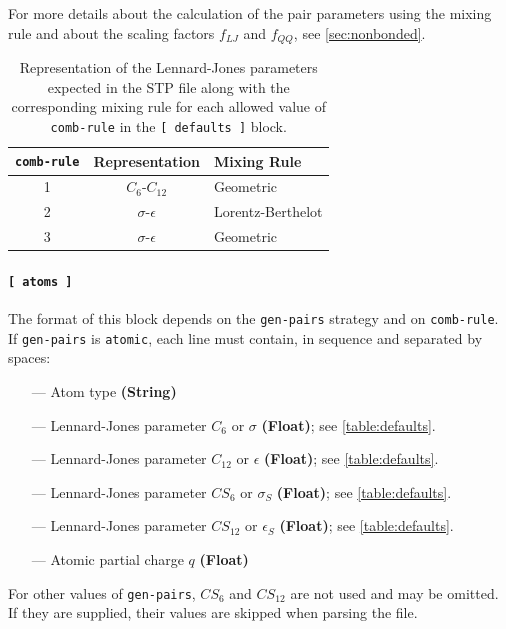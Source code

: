 \documentclass[10pt,a4paper]{report}
\numberwithin{equation}{section}
\begin{document}
For more details about the calculation of the pair parameters using the mixing rule and about the scaling factors $f_{LJ}$ and $f_{QQ}$, see \autoref{sec:nonbonded}.

\begin{table}[tb]
  \caption{Representation of the Lennard-Jones parameters expected in
    the STP file along with the corresponding mixing rule for each
    allowed value of \texttt{comb-rule} in the \texttt{[~defaults~]}
    block.}
  \label{table:defaults}
  \hspace{1ex}\par
  \centering
  \begin{tabular}{ccl}
    \toprule
    \texttt{comb-rule} & Representation & Mixing Rule \\ \midrule
    1 & $C_6$-$C_{12}$ & Geometric \\
    2 & $\sigma$-$\epsilon$ & Lorentz-Berthelot \\
    3 & $\sigma$-$\epsilon$ & Geometric \\
    \bottomrule
  \end{tabular}
\end{table}

\paragraph{\texttt{[~atoms~]}}

The format of this block depends on the \texttt{gen-pairs} strategy and on \texttt{comb-rule}.
If \texttt{gen-pairs} is \texttt{atomic}, each line must contain, in sequence and separated by spaces:
\begin{itemize}
\item[---] Atom type \textbf{(String)}
\item[---] Lennard-Jones parameter $C_6$ or $\sigma$ \textbf{(Float)}; see \autoref{table:defaults}.
\item[---] Lennard-Jones parameter $C_{12}$ or $\epsilon$ \textbf{(Float)}; see \autoref{table:defaults}.
\item[---] Lennard-Jones parameter $CS_6$ or $\sigma_S$ \textbf{(Float)}; see \autoref{table:defaults}.
\item[---] Lennard-Jones parameter $CS_{12}$ or $\epsilon_S$ \textbf{(Float)}; see \autoref{table:defaults}.
\item[---] Atomic partial charge $q$ \textbf{(Float)}
\end{itemize}
For other values of \texttt{gen-pairs}, $CS_6$ and $CS_{12}$ are not used and may be omitted.
If they are supplied, their values are skipped when parsing the file.
\end{document}
